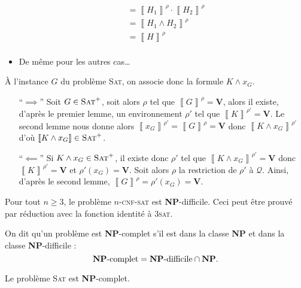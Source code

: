 \begin{prv}
\begin{prvk}
\begin{itemize}
\begin{align*}
					&= \left\llbracket H_1 \right\rrbracket^\rho \cdot  \left\llbracket H_2 \right\rrbracket^\rho \\
					&= \left\llbracket H_1 \land H_2 \right\rrbracket^\rho \\
					&= \left\llbracket H \right\rrbracket^\rho \\
				\end{align*}
			\item De même pour les autres cas\ldots
		\end{itemize}
	\end{prvk}

	À l'instance $G$\/ du problème \textsc{Sat}, on associe donc la formule $K \land x_G$.
	\begin{itemize}
		\item[``$\implies$''] Soit $G \in \textsc{Sat}^+$, soit alors $\rho$\/ tel que $\left\llbracket G \right\rrbracket^\rho = \mathbf{V}$, alors il existe, d'après le premier lemme, un environnement $\rho'$\/ tel que $\left\llbracket K \right\rrbracket^{\rho'} = \mathbf{V}$. Le second lemme nous donne alors $\left\llbracket x_G \right\rrbracket^{\rho'} = \left\llbracket G \right\rrbracket^\rho = \mathbf{V}$ donc $\left\llbracket K \land x_G \right\rrbracket^{\rho'}$\/ d'où $\left\llbracket K \land x_G \right\rrbracket \in \textsc{Sat}^+$.
		\item[``$\impliedby$''] Si $K \land x_G \in \textsc{Sat}^+$, il existe donc $\rho'$\/ tel que $\left\llbracket K \land x_G \right\rrbracket^{\rho'} = \mathbf{V}$\/ donc $\left\llbracket K \right\rrbracket^{\rho'} = \mathbf{V}$\/ et $\rho'(x_G) = \mathbf{V}$. Soit alors $\rho$\/ la restriction de $\rho'$\/ à $\mathcal{Q}$. Ainsi, d'après le second lemme, $\left\llbracket G \right\rrbracket^\rho = \rho'(x_G) = \mathbf{V}$.
	\end{itemize}
\end{prv}

\begin{rmk}
	Pour tout $n \ge 3$, le problème $n$-\textsc{cnf}-\textsc{sat} est \textbf{NP}-difficile. Ceci peut être prouvé par réduction avec la fonction identité à 3\textsc{sat}.
\end{rmk}

\begin{defn}
	On dit qu'un problème est \textbf{NP}-complet s'il est dans la classe \textbf{NP} et dans la classe \textbf{NP}-difficile : \[
		\text{\textbf{NP}-complet} = \text{\textbf{NP}-difficile} \cap \text{\textbf{NP}}
	.\]
\end{defn}

\begin{rmk}
	Le problème \textsc{Sat} est \textbf{NP}-complet.
\end{rmk}
